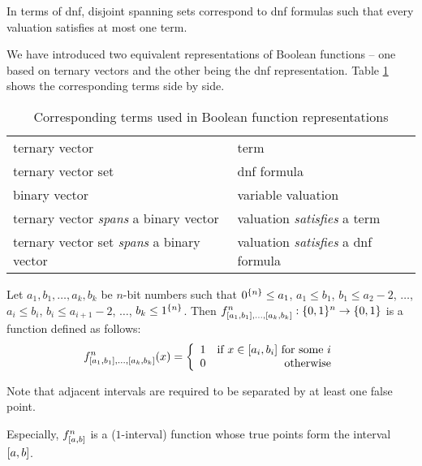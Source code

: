 In terms of \acrshort{dnf},
disjoint spanning sets
correspond to \acrshort{dnf} formulas
such that every valuation satisfies at most one term.

We have introduced two equivalent representations
of Boolean functions --
one based on ternary vectors
and the other being the \acrshort{dnf} representation.
Table \ref{table:representations}
shows the corresponding terms side by side.

\begin{table}[h]
\label{table:representations}
\centering
\begin{tabular}{ll}
ternary vector & term \\
ternary vector set & \acrshort{dnf} formula \\
binary vector & variable valuation \\
ternary vector \emph{spans} a binary vector &
valuation \emph{satisfies} a term \\
ternary vector set \emph{spans} a binary vector &
valuation \emph{satisfies} a \acrshort{dnf} formula
\end{tabular}
\caption{
Corresponding terms used
in Boolean function representations
}
\end{table}


\begin{definition}
\label{def:kibf}
Let $a_1, b_1, \ldots, a_k, b_k$ be $n$-bit numbers
such that $0^{\{n\}} \leq a_1$,
$a_1 \leq b_1$,
$b_1 \leq a_2 - 2$,
$\ldots$,
$a_i \leq b_i$,
$b_i \leq a_{i+1} - 2$,
$\ldots$,
$b_k \leq 1^{\{n\}}$.
Then $f^n_{[a_1, b_1], \ldots, [a_k, b_k]}: \{0, 1\}{}^n \rightarrow \{0, 1\}{}$ is a function defined as follows:
\[f^n_{\interval{a_1}{b_1}, \ldots, \interval{a_k}{b_k}} (x) = \left\{
  \begin{array}{lr}
    1 & $if $ x \in \interval{a_i}{b_i}$ for some $i\\
    0 & $otherwise$
  \end{array}
\right.
\]
\end{definition}

Note that adjacent intervals
are required to be separated by at least one false point.

Especially,
$f^n_{[a, b]}$ is a ($1$-interval) function
whose true points form the interval $[a, b]$.

